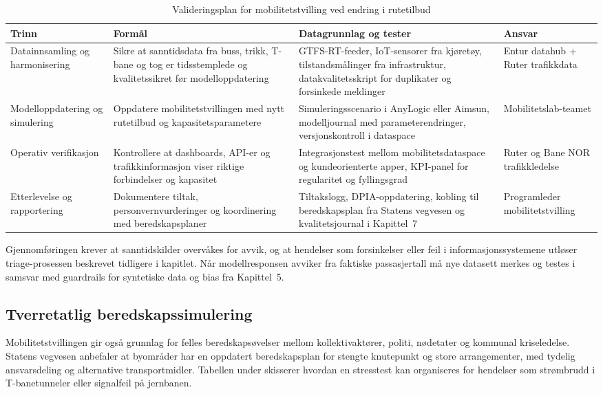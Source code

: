 \begin{table}[ht]
    \centering
    \caption{Valideringsplan for mobilitetstvilling ved endring i rutetilbud}
    \label{tab:mobilitet-validering}
    \begin{tabular}{|p{3.4cm}|p{4.6cm}|p{4.6cm}|p{3.0cm}|}
        \hline
        \textbf{Trinn} & \textbf{Formål} & \textbf{Datagrunnlag og tester} & \textbf{Ansvar} \\
        \hline
        Datainnsamling og harmonisering & Sikre at sanntidsdata fra buss, trikk, T-bane og tog er tidsstemplede og kvalitetssikret før modelloppdatering & GTFS-RT-feeder, IoT-sensorer fra kjøretøy, tilstandsmålinger fra infrastruktur, datakvalitetsskript for duplikater og forsinkede meldinger & Entur datahub + Ruter trafikkdata \\
        \hline
        Modelloppdatering og simulering & Oppdatere mobilitetstvillingen med nytt rutetilbud og kapasitetsparametere & Simuleringsscenario i AnyLogic eller Aimsun, modelljournal med parameterendringer, versjonskontroll i dataspace & Mobilitetslab-teamet \\
        \hline
        Operativ verifikasjon & Kontrollere at dashboards, API-er og trafikkinformasjon viser riktige forbindelser og kapasitet & Integrasjonstest mellom mobilitetsdataspace og kundeorienterte apper, KPI-panel for regularitet og fyllingsgrad & Ruter og Bane NOR trafikkledelse \\
        \hline
        Etterlevelse og rapportering & Dokumentere tiltak, personvernvurderinger og koordinering med beredskapsplaner & Tiltakslogg, DPIA-oppdatering, kobling til beredskapsplan fra Statens vegvesen og kvalitetsjournal i Kapittel~7 & Programleder mobilitetstvilling \\
        \hline
    \end{tabular}
\end{table}

Gjennomføringen krever at sanntidskilder overvåkes for avvik, og at hendelser som forsinkelser eller feil i informasjonssystemene utløser triage-prosessen beskrevet tidligere i kapitlet. Når modellresponsen avviker fra faktiske passasjertall må nye datasett merkes og testes i samsvar med guardrails for syntetiske data og bias fra Kapittel~5.

\subsection{Tverretatlig beredskapssimulering}
Mobilitetstvillingen gir også grunnlag for felles beredskapsøvelser mellom kollektivaktører, politi, nødetater og kommunal kriseledelse. Statens vegvesen anbefaler at byområder har en oppdatert beredskapsplan for stengte knutepunkt og store arrangementer, med tydelig ansvarsdeling og alternative transportmidler.\citep{vegvesen2023beredskap} Tabellen under skisserer hvordan en stresstest kan organiseres for hendelser som strømbrudd i T-banetunneler eller signalfeil på jernbanen.

